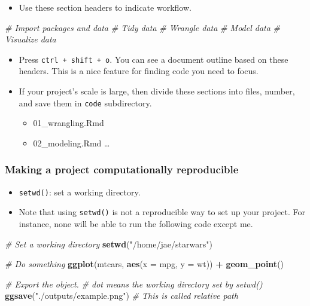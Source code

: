 \documentclass[
]{book}
\newenvironment{Shaded}{\begin{snugshade}}{\end{snugshade}}
\newcommand{\CommentTok}[1]{\textcolor[rgb]{0.56,0.35,0.01}{\textit{#1}}}
\newcommand{\DataTypeTok}[1]{\textcolor[rgb]{0.13,0.29,0.53}{#1}}
\newcommand{\KeywordTok}[1]{\textcolor[rgb]{0.13,0.29,0.53}{\textbf{#1}}}
\newcommand{\NormalTok}[1]{#1}
\newcommand{\OperatorTok}[1]{\textcolor[rgb]{0.81,0.36,0.00}{\textbf{#1}}}
\newcommand{\StringTok}[1]{\textcolor[rgb]{0.31,0.60,0.02}{#1}}
\providecommand{\tightlist}{%
  \setlength{\itemsep}{0pt}\setlength{\parskip}{0pt}}
\begin{document}
\begin{itemize}
\tightlist
\item
  Use these section headers to indicate workflow.
\end{itemize}

\begin{Shaded}
\begin{Highlighting}[]
\CommentTok{\# Import packages and data}
\CommentTok{\# Tidy data}
\CommentTok{\# Wrangle data}
\CommentTok{\# Model data}
\CommentTok{\# Visualize data}
\end{Highlighting}
\end{Shaded}

\begin{itemize}
\item
  Press \texttt{ctrl\ +\ shift\ +\ o}. You can see a document outline based on these headers. This is a nice feature for finding code you need to focus.
\item
  If your project's scale is large, then divide these sections into files, number, and save them in \texttt{code} subdirectory.

  \begin{itemize}
  \tightlist
  \item
    01\_wrangling.Rmd
  \item
    02\_modeling.Rmd
    \ldots{}
  \end{itemize}
\end{itemize}

\hypertarget{making-a-project-computationally-reproducible}{%
\subsubsection{Making a project computationally reproducible}\label{making-a-project-computationally-reproducible}}

\begin{itemize}
\item
  \texttt{setwd()}: set a working directory.
\item
  Note that using \texttt{setwd()} is not a reproducible way to set up your project. For instance, none will be able to run the following code except me.
\end{itemize}

\begin{Shaded}
\begin{Highlighting}[]
\CommentTok{\# Set a working directory }
\KeywordTok{setwd}\NormalTok{(}\StringTok{"/home/jae/starwars"}\NormalTok{)}

\CommentTok{\# Do something }
\KeywordTok{ggplot}\NormalTok{(mtcars, }\KeywordTok{aes}\NormalTok{(}\DataTypeTok{x =}\NormalTok{ mpg, }\DataTypeTok{y =}\NormalTok{ wt)) }\OperatorTok{+}
\StringTok{   }\KeywordTok{geom\_point}\NormalTok{()}

\CommentTok{\# Export the object. }
\CommentTok{\# dot means the working directory set by setwd()}
\KeywordTok{ggsave}\NormalTok{(}\StringTok{"./outputs/example.png"}\NormalTok{) }\CommentTok{\# This is called relative path }
\end{Highlighting}
\end{Shaded}
\end{document}

